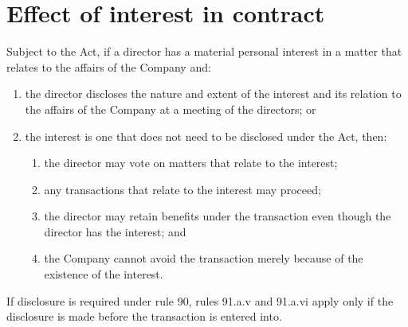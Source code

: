 \section{Effect of interest in contract}

Subject to the Act, if a director has a material personal interest in a matter that relates to the affairs of the Company and:

\begin{enumerate}[label=(\alph*)]
    \item the director discloses the nature and extent of the interest and its relation to the affairs of the Company at a meeting of the directors; or
    
    \item the interest is one that does not need to be disclosed under the Act, then:
    \begin{enumerate}[label=(\roman*)]
        \item the director may vote on matters that relate to the interest;
        \item any transactions that relate to the interest may proceed;
        \item the director may retain benefits under the transaction even though the director has the interest; and
        \item the Company cannot avoid the transaction merely because of the existence of the interest.
    \end{enumerate}
\end{enumerate}

If disclosure is required under rule 90, rules 91.a.v and 91.a.vi apply only if the disclosure is made before the transaction is entered into. 